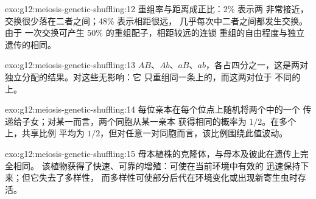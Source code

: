 \begin{solution}{exo:g12:meiosis-genetic-shuffling:12}
重组率与距离成正比：2\% 表示两
非常接近，交换很少落在二者之间；48\% 表示相距很远，
几乎每次中二者之间都发生交换。由于
一次交换可产生 50\% 的重组配子，相距较远的连锁
重组的自由程度与独立遗传的相同。
\end{solution}

\begin{solution}{exo:g12:meiosis-genetic-shuffling:13}
$AB$、$Ab$、$aB$、$ab$，各占四分之一，这是两对
独立分配的结果。对这些无影响：它
只重组同一条上的，而这两对位于
不同的上。
\end{solution}

\begin{solution}{exo:g12:meiosis-genetic-shuffling:14}
每位亲本在每个位点上随机将两个中的一个
传递给子女；对某一而言，两个同胞从某一亲本
获得相同的概率为 $1/2$。在多个上，共享比例
平均为 $1/2$，但对任意一对同胞而言，该比例围绕此值波动。
\end{solution}

\begin{solution}{exo:g12:meiosis-genetic-shuffling:15}
母本植株的克隆体，与母本及彼此在遗传上完全相同。
该植物获得了快速、可靠的增殖：可使在当前环境中有效的
迅速保持下来；但它失去了多样性，
而多样性可使部分后代在环境变化或出现新寄生虫时存活。
\end{solution}

